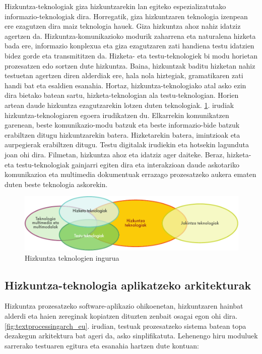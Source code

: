 \begin{multicols}{2}

  Hizkuntza-teknologiak giza hizkuntzarekin lan egiteko espezializatutako informazio-teknologiak dira. Horregatik, giza hizkuntzaren teknologia izenpean ere ezagutzen dira maiz teknologia hauek. Giza hizkuntza ahoz nahiz idatziz agertzen da. Hizkuntza-komunikazioko modurik zaharrena eta naturalena hizketa bada ere, informazio konplexua eta giza ezagutzaren zati handiena testu idatzien bidez gorde eta transmititzen da. Hizketa- eta testu-teknologiek bi modu horietan prozesatzen edo sortzen dute hizkuntza. Baina, hizkuntzak baditu hizketan nahiz testuetan agertzen diren alderdiak ere, hala nola hiztegiak, gramatikaren zati handi bat eta esaldien esanahia. Hortaz, hizkuntza-teknologiako atal asko ezin dira bietako batean sartu, hizketa-teknologian ala testu-teknologian. Horien artean daude hizkuntza ezagutzarekin lotzen duten teknologiak. \ref{fig:ltincontext_eu}. irudiak hizkuntza-teknologiaren egoera irudikatzen du. Elkarrekin komunikatzen garenean, beste komunikazio-modu batzuk eta beste informazio-bide batzuk erabiltzen ditugu hizkuntzarekin batera. Hizketarekin batera, imintzioak eta aurpegierak erabiltzen ditugu. Testu digitalak irudiekin eta hotsekin lagunduta joan ohi dira. Filmetan, hizkuntza ahoz eta idatziz ager daiteke. Beraz, hizketa- eta testu-teknologiak gainjarri egiten dira eta interakzioan daude askotariko komunikazioa eta multimedia dokumentuak errazago prozesatzeko aukera ematen duten beste teknologia askorekin. 
  
 
   \begin{figure}[htb]
  \center
  \includegraphics[width=\textwidth]{../_media/basque/language_technologies}
  \caption{Hizkuntza teknologien ingurua}
  \label{fig:ltincontext_eu}
\end{figure}

\subsection[Hizkuntza-teknologia aplikatzeko arkitekturak]{Hizkuntza-teknologia aplikatzeko arkitekturak}
    Hizkuntza prozesatzeko software-aplikazio ohikoenetan, hizkuntzaren hainbat alderdi eta haien zereginak kopiatzen dituzten zenbait osagai egon ohi dira. \ref{fig:textprocessingarch_eu}. irudian, testuak prozesatzeko sistema batean topa dezakegun arkitektura bat ageri da, asko sinplifikatuta. Lehenengo hiru moduluek sarrerako testuaren egitura eta esanahia hartzen dute kontuan:


\end{multicols}
